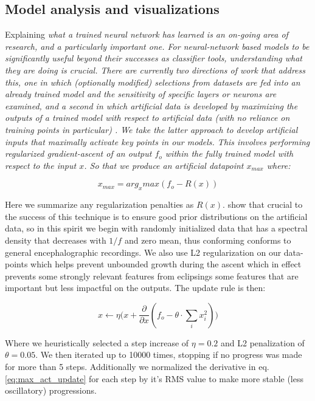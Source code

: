 \documentclass[utf8]{frontiersSCNS} %
\begin{document}
\subsection{Model analysis and visualizations}

Explaining \em{what} a trained neural network has learned is an on-going area of research, and a particularly important one. For neural-network based models to be significantly useful beyond their successes as classifier tools, understanding what they are doing is crucial. There are currently two directions of work that address this, one in which (optionally modified) selections from datasets are fed into an already trained model and the sensitivity of specific layers or neurons are examined, and a second in which artificial data is developed by maximizing the outputs of a trained model with respect to artificial data (with no reliance on training points in particular) \cite{Yosinski2015}. We take the latter approach to develop artificial inputs that \em{maximally activate} key points in our models. This involves performing regularized gradient-ascent of an output $f_o$ within the fully trained model with respect to the input $x$. So that we produce an artificial datapoint $x_{max}$ where:

\begin{equation} \label{eq:max_act}
  x_{max} = arg_xmax(f_o - R(x))
\end{equation}

Here we summarize any regularization penalties as $R(x)$. \cite{Yosinski2015} show that crucial to the success of this technique is to ensure good prior distributions on the artificial data, so in this spirit we begin with randomly initialized data that has a spectral density that decreases with $1/f$ and zero mean, thus conforming conforms to general encephalographic recordings. We also use L2 regularization on our data-points which helps prevent unbounded growth during the ascent which in effect prevents some strongly relevant features from eclipsings some features that are important but less impactful on the outputs. The update rule is then:

\begin{equation} \label{eq:max_act_update}
  x \leftarrow \eta \big(x + \frac{\partial }{\partial x}(f_o - \theta \cdot {}\sum_ix_i^2) \big)
\end{equation}

Where we heuristically selected a step increase of $\eta = 0.2$ and L2 penalization of $\theta = 0.05$. We then iterated up to 10000 times, stopping if no progress was made for more than 5 steps. Additionally we normalized the derivative in eq. \ref{eq:max_act_update} for each step by it's RMS value to make more stable (less oscillatory) progressions.
\end{document}
